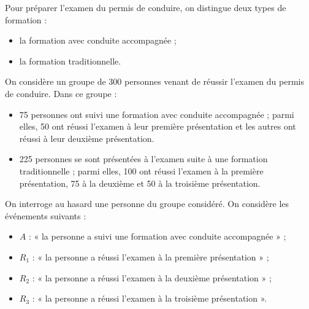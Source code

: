 Pour préparer l’examen du permis de conduire, on distingue deux types de formation :

\begin{itemize}
	\item la formation avec conduite accompagnée ;
	\item la formation traditionnelle. 
\end{itemize}

On considère un groupe de 300 personnes venant de réussir l’examen du permis de conduire. Dans ce groupe :

\begin{itemize}
	\item 75 personnes ont suivi une formation avec conduite accompagnée ; parmi elles, 50 ont réussi l’examen à leur première présentation et les autres ont réussi à leur deuxième présentation.
	\item 225 personnes se sont présentées à l’examen suite à une formation traditionnelle ; parmi elles, 100 ont réussi l’examen à la première présentation, 75 à la deuxième et 50 à la troisième présentation.
\end{itemize}

On interroge au hasard une personne du groupe considéré.
On considère les événements suivants :

\begin{itemize}
	\item $A$ : « la personne a suivi une formation avec conduite accompagnée » ;
	\item $R_1$ : « la personne a réussi l’examen à la première présentation » ;
	\item $R_2$ : « la personne a réussi l’examen à la deuxième présentation » ;
	\item $R_3$ : « la personne a réussi l’examen à la troisième présentation ».
\end{itemize}

